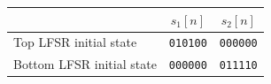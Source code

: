 \begin{tabular}{lcc}
\toprule
 & $s_1[n]$ & $s_2[n]$ \\
\midrule
Top LFSR initial state & \texttt{010100} & \texttt{000000} \\
Bottom LFSR initial state & \texttt{000000} & \texttt{011110} \\
\bottomrule
\end{tabular}
